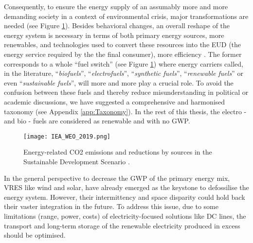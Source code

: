 Consequently, to ensure the energy supply of an assumably more and more demanding society in a context of environmental crisis, major transformations are needed (see Figure \ref{fig:intro:IEA_WEO_2019}). Besides behavioral changes, an overall reshape of the energy system is necessary in terms of both primary energy sources, \ie more renewables, and technologies used to convert these resources into the \gls{EUD} (\ie the energy service required by the the final consumer), \ie more efficiency \cite{iea2020world,luderer2018residual}. The former corresponds to a whole ``fuel switch'' (see Figure \ref{fig:intro:IEA_WEO_2019}) where energy carriers called, in the literature, ``\emph{biofuels}'', ``\emph{electrofuels}'', ``\emph{synthetic fuels}'', ``\emph{renewable fuels}'' or even ``\emph{sustainable fuels}'', will more and more play a crucial role. To avoid the confusion between these fuels and thereby reduce misunderstanding in political or academic discussions, we have suggested a comprehensive and harmonised taxonomy (see Appendix \ref{app:Taxonomy}). In the rest of this thesis, the electro - and bio - fuels are considered as renewable and with no \gls{GWP}.  

\begin{figure}[ht!]
\centering
\texttt{[image: IEA\_WEO\_2019.png]}
\caption{Energy-related CO2 emissions and reductions by sources in the Sustainable Development Scenario \cite{iea2020world}.}
\label{fig:intro:IEA_WEO_2019}
\end{figure}

In the general perspective to decrease the \gls{GWP} of the primary energy mix, \gls{VRES} like wind and solar, have already emerged as the keystone to defossilise the energy system. However, their intermittency and space disparity could hold back their vaster integration in the future. To address this issue, due to some limitations (\eg range, power, costs) of electricity-focused solutions like \gls{DC} lines, the transport and long-term storage of the renewable electricity produced in excess should be optimised.

